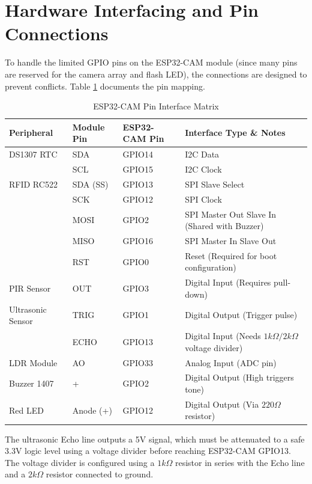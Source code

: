 \documentclass[11pt,a4paper]{report}
\begin{document}
\section{Hardware Interfacing and Pin Connections}
To handle the limited GPIO pins on the ESP32-CAM module (since many pins are reserved for the camera array and flash LED), the connections are designed to prevent conflicts. Table \ref{tab:connections} documents the pin mapping.
\begin{table}[H]
\centering
\caption{ESP32-CAM Pin Interface Matrix}
\label{tab:connections}
\begin{tabular}{lllp{6cm}}
    \toprule
    \textbf{Peripheral} & \textbf{Module Pin} & \textbf{ESP32-CAM Pin} & \textbf{Interface Type \& Notes} \\
    \midrule
    DS1307 RTC & SDA & GPIO14 & I2C Data \\
               & SCL & GPIO15 & I2C Clock \\
    RFID RC522 & SDA (SS) & GPIO13 & SPI Slave Select \\
               & SCK & GPIO12 & SPI Clock \\
               & MOSI & GPIO2 & SPI Master Out Slave In (Shared with Buzzer) \\
               & MISO & GPIO16 & SPI Master In Slave Out \\
               & RST & GPIO0 & Reset (Required for boot configuration) \\
    PIR Sensor & OUT & GPIO3 & Digital Input (Requires pull-down) \\
    Ultrasonic Sensor & TRIG & GPIO1 & Digital Output (Trigger pulse) \\
                      & ECHO & GPIO13 & Digital Input (Needs $1k\Omega/2k\Omega$ voltage divider) \\
    LDR Module & AO & GPIO33 & Analog Input (ADC pin) \\
    Buzzer 1407 & + & GPIO2 & Digital Output (High triggers tone) \\
    Red LED & Anode (+) & GPIO12 & Digital Output (Via $220\Omega$ resistor) \\
    \bottomrule
\end{tabular}
\end{table}
The ultrasonic Echo line outputs a 5V signal, which must be attenuated to a safe 3.3V logic level using a voltage divider before reaching ESP32-CAM GPIO13. The voltage divider is configured using a $1k\Omega$ resistor in series with the Echo line and a $2k\Omega$ resistor connected to ground.
\end{document}
